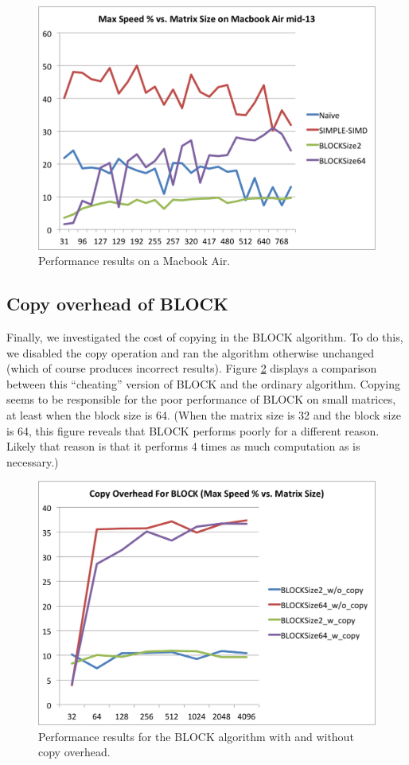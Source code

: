 \documentclass{article}
\begin{document}
\begin{figure}
  \includegraphics[width=\textwidth]{MacbookAirChart1}
  \caption{Performance results on a Macbook Air.}
  \label{fig:perf-laptop}
\end{figure}

\subsection{Copy overhead of BLOCK}
Finally, we investigated the cost of copying in the BLOCK algorithm.  To do this, we disabled the copy operation and ran the algorithm otherwise unchanged (which of course produces incorrect results).  Figure \ref{fig:copy-overhead} displays a comparison between this ``cheating'' version of BLOCK and the ordinary algorithm.  Copying seems to be responsible for the poor performance of BLOCK on small matrices, at least when the block size is 64.  (When the matrix size is 32 and the block size is 64, this figure reveals that BLOCK performs poorly for a different reason.  Likely that reason is that it performs 4 times as much computation as is necessary.)

\begin{figure}
  \includegraphics[width=\textwidth]{MacbookAirChart2}
  \caption{Performance results for the BLOCK algorithm with and without copy overhead.}
  \label{fig:copy-overhead}
\end{figure}
\end{document}
